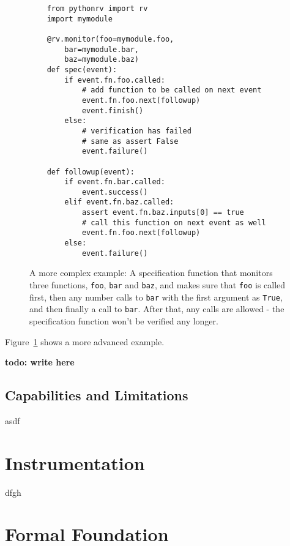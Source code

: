 \documentclass[a4paper,11pt]{kth-mag}
\newcommand{\todo}[1]{\textbf{todo: #1}}
\begin{document}
\begin{figure}[h!]

	\begin{center}
	\begin{minipage}{0.7\textwidth}
	\begin{lstlisting}
	from pythonrv import rv
	import mymodule

	@rv.monitor(foo=mymodule.foo,
		bar=mymodule.bar,
		baz=mymodule.baz)
	def spec(event):
		if event.fn.foo.called:
			# add function to be called on next event
			event.fn.foo.next(followup)
			event.finish()
		else:
			# verification has failed
			# same as assert False
			event.failure()

	def followup(event):
		if event.fn.bar.called:
			event.success()
		elif event.fn.baz.called:
			assert event.fn.baz.inputs[0] == true
			# call this function on next event as well
			event.fn.foo.next(followup)
		else:
			event.failure()
	\end{lstlisting}
	\end{minipage}
	\end{center}

	\caption{A more complex example: A specification function that monitors three
		functions, \texttt{foo}, \texttt{bar} and \texttt{baz}, and makes sure that
		\texttt{foo} is called first, then any number calls to \texttt{bar} with
		the first argument as \texttt{True}, and then finally a call to
	\texttt{bar}. After that, any calls are allowed - the specification function
won't be verified any longer.}
	\label{figure-syntax-example-3}
\end{figure}

Figure~\ref{figure-syntax-example-3} shows a more advanced example.

\todo{write here}


\subsection{Capabilities and Limitations}

asdf

\section{Instrumentation} \label{section-method-instrumentation}

dfgh


\section{Formal Foundation} \label{section-method-syntax}
\end{document}
